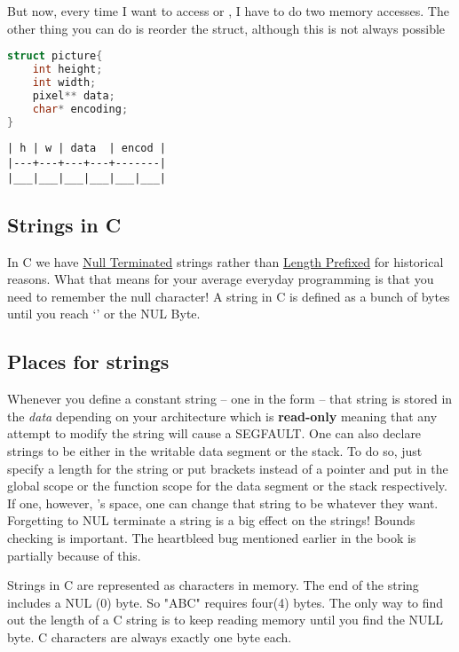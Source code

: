But now, every time I want to access  or ,
I have to do two memory accesses.
The other thing you can do is reorder
the struct, although this is not always possible

\begin{lstlisting}[language=C]
struct picture{
    int height;
    int width;
    pixel** data;
    char* encoding;
}
\end{lstlisting}

\begin{verbatim}
| h | w | data  | encod |
|---+---+---+---+-------|
|___|___|___|___|___|___|
\end{verbatim}

\subsection{Strings in C}

In C we have
\href{https://en.wikipedia.org/wiki/Null-terminated_string}{Null
	Terminated} strings rather than
\href{https://en.wikipedia.org/wiki/String_(computer_science)\#Length-prefixed}{Length
	Prefixed} for historical reasons. What that means for your average everyday programming is that you need to remember the null character!
A string in C is defined as a bunch of bytes until you reach `\0' or the NUL Byte.

\subsection{Places for strings}

Whenever you define a constant string -- one in the form  -- that string is stored in the \emph{data} depending on your architecture which is \textbf{read-only} meaning that any attempt to modify the string will cause a SEGFAULT.
One can also declare strings to be either in the writable data segment or the stack. To do so, just specify a length for the string or put brackets instead of a pointer  and put in the global scope or the function scope for the data segment or the stack respectively.
If one, however, 's space, one can change that string to be whatever they want.
Forgetting to NUL terminate a string is a big effect on the strings! Bounds checking is important.
The heartbleed bug mentioned earlier in the book is partially because of this.

Strings in C are represented as characters in memory.
The end of the string includes a NUL (0) byte.
So "ABC" requires four(4) bytes.
The only way to find out the length of a C string is to keep reading memory until you find the NULL byte.
C characters are always exactly one byte each.

